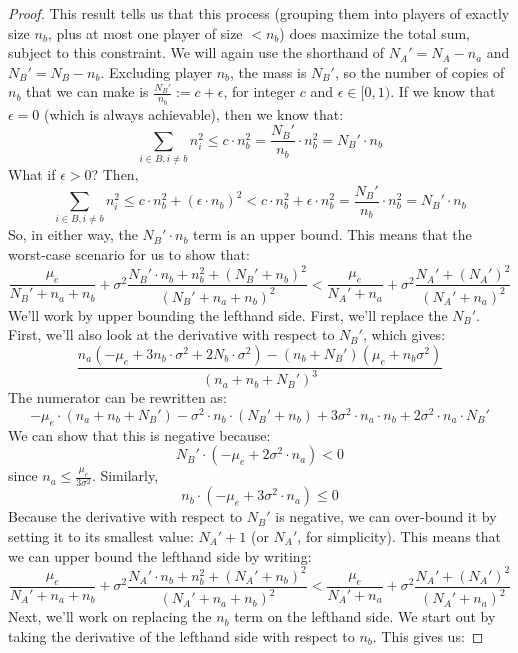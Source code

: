 \documentclass{article}
\newcommand{\cd}[0]{\cdot}
\newcommand{\mue}[0]{\ensuremath{\mu_e}}
\newcommand{\var}[0]{\ensuremath{\sigma^2}}
\newcommand{\ndraw}[0]{\ensuremath{n}}
\newcommand{\total}[0]{\ensuremath{N}}
\begin{document}
\begin{proof}
This result tells us that this process (grouping them into players of exactly size $\ndraw_b$, plus at most one player of size $< \ndraw_b$) does maximize the total sum, subject to this constraint. We will again use the shorthand of $\total_A' = \total_A -\ndraw_a$ and $\total_B' = \total_B - \ndraw_b$. Excluding player $\ndraw_b$, the mass is $\total_B'$, so the number of copies of $\ndraw_b$ that we can make is $\frac{\total_B'}{\ndraw_b}:= c + \epsilon$, for integer $c$ and $\epsilon \in [0, 1)$. If we know that $\epsilon = 0$ (which is always achievable), then we know that: 
$$\sum_{i \in B, i \ne b}\ndraw_i^2 \leq c \cd \ndraw_b^2 = \frac{\total_B'}{\ndraw_b} \cd \ndraw_b^2  = \total_B' \cd \ndraw_b$$
What if $\epsilon > 0$? Then, 
$$\sum_{i \in B, i \ne b}\ndraw_i^2 \leq c \cd \ndraw_b^2 + (\epsilon \cd \ndraw_b)^2 < c \cd \ndraw_b^2 + \epsilon \cd \ndraw_b^2 = \frac{\total_B'}{\ndraw_b} \cd \ndraw_b^2  = \total_B' \cd \ndraw_b$$
So, in either way, the $\total_B' \cd \ndraw_b$ term is an upper bound. This means that the worst-case scenario for us to show that: 
$$\frac{\mue}{\total_B' + \ndraw_a + \ndraw_b} + \var \frac{\total_B' \cd \ndraw_b + \ndraw_b^2 + (\total_B'+\ndraw_b)^2}{(\total_B' + \ndraw_a + \ndraw_b)^2} < \frac{\mue}{\total_A' + \ndraw_a} + \var \frac{\total_A'+ (\total_A')^2}{(\total_A' + \ndraw_a)^2} $$
We'll work by upper bounding the lefthand side. First, we'll replace the $\total_B'$. First, we'll also look at the derivative with respect to $\total_B'$, which gives: 
$$\frac{\ndraw_a (-\mue+3 \ndraw_b \cd \var+2 \total_b \cd \var)-(\ndraw_b+\total_B') (\mue+\ndraw_b \var)}{(\ndraw_a+\ndraw_b+\total_B')^3}$$
The numerator can be rewritten as: 
$$-\mue \cd (\ndraw_a + \ndraw_b + \total_B') - \var \cd \ndraw_b \cd (\total_B' + \ndraw_b) + 3 \var \cd \ndraw_a \cd \ndraw_b + 2 \var \cd \ndraw_a \cd \total_B'$$
We can show that this is negative because: 
$$\total_B' \cd (-\mue + 2 \var \cd \ndraw_a) < 0$$
since $\ndraw_a \leq \frac{\mue}{3\var}$. Similarly, 
$$\ndraw_b \cd (-\mue + 3 \var \cd \ndraw_a) \leq 0$$
Because the derivative with respect to $\total_B'$ is negative, we can over-bound it by setting it to its smallest value: $\total_A'+1$ (or $\total_A'$, for simplicity). This means that we can upper bound the lefthand side by writing:  
$$\frac{\mue}{\total_A' + \ndraw_a + \ndraw_b} + \var \frac{\total_A' \cd \ndraw_b + \ndraw_b^2 + (\total_A'+\ndraw_b)^2}{(\total_A' + \ndraw_a + \ndraw_b)^2} < \frac{\mue}{\total_A' + \ndraw_a} + \var \frac{\total_A'+ (\total_A')^2}{(\total_A' + \ndraw_a)^2} $$
Next, we'll work on replacing the $\ndraw_b$ term on the lefthand side. We start out by taking the derivative of the lefthand side with respect to $\ndraw_b$. This gives us: 

\end{proof}
\end{document}
